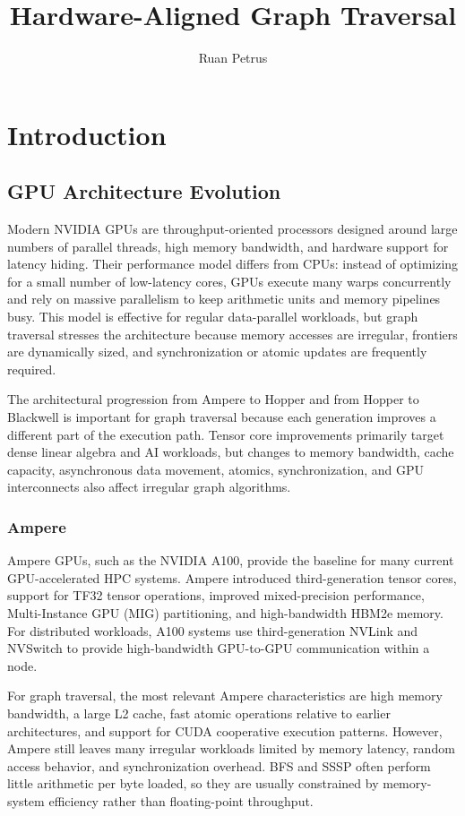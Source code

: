 \documentclass{article}
\author{Ruan Petrus}
\title{Hardware-Aligned Graph Traversal}
\begin{document}
\section{Introduction}
\subsection{GPU Architecture Evolution}

Modern NVIDIA GPUs are throughput-oriented processors designed around large numbers of parallel threads, high memory bandwidth, and hardware support for latency hiding. Their performance model differs from CPUs: instead of optimizing for a small number of low-latency cores, GPUs execute many warps concurrently and rely on massive parallelism to keep arithmetic units and memory pipelines busy. This model is effective for regular data-parallel workloads, but graph traversal stresses the architecture because memory accesses are irregular, frontiers are dynamically sized, and synchronization or atomic updates are frequently required.

The architectural progression from Ampere to Hopper and from Hopper to Blackwell is important for graph traversal because each generation improves a different part of the execution path. Tensor core improvements primarily target dense linear algebra and AI workloads, but changes to memory bandwidth, cache capacity, asynchronous data movement, atomics, synchronization, and GPU interconnects also affect irregular graph algorithms.

\subsubsection*{Ampere}

Ampere GPUs, such as the NVIDIA A100, provide the baseline for many current GPU-accelerated HPC systems. Ampere introduced third-generation tensor cores, support for TF32 tensor operations, improved mixed-precision performance, Multi-Instance GPU (MIG) partitioning, and high-bandwidth HBM2e memory. For distributed workloads, A100 systems use third-generation NVLink and NVSwitch to provide high-bandwidth GPU-to-GPU communication within a node.

For graph traversal, the most relevant Ampere characteristics are high memory bandwidth, a large L2 cache, fast atomic operations relative to earlier architectures, and support for CUDA cooperative execution patterns. However, Ampere still leaves many irregular workloads limited by memory latency, random access behavior, and synchronization overhead. BFS and SSSP often perform little arithmetic per byte loaded, so they are usually constrained by memory-system efficiency rather than floating-point throughput.
\end{document}
